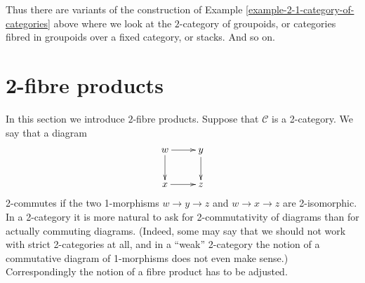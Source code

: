 \begin{remark}
\label{remark-other-2-categories}
Thus there are variants of the construction of
Example \ref{example-2-1-category-of-categories}
above where we look at the $2$-category of groupoids,
or categories fibred in groupoids over a fixed
category, or stacks. And so on.
\end{remark}






\section{2-fibre products}
\label{section-2-fibre-products}

\noindent
In this section we introduce $2$-fibre products. Suppose that $\mathcal{C}$
is a 2-category. We say that a diagram
$$
\xymatrix{
w \ar[r] \ar[d] & y \ar[d] \\
x \ar[r] & z }
$$
2-commutes if the two 1-morphisms $w \to y \to z$ and $w \to x \to z$ are
2-isomorphic. In a 2-category it is more natural to ask for 2-commutativity
of diagrams than for actually commuting diagrams. (Indeed, some may say that
we should not work with strict 2-categories at all, and in a ``weak''
2-category the notion of a commutative diagram of 1-morphisms does not even
make sense.) Correspondingly the notion of a fibre product has to be adjusted.


